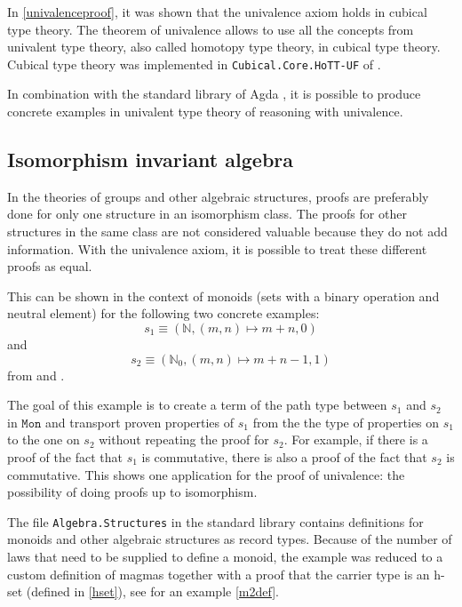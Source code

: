 \documentclass[12pt,a4paper,twoside,xetex]{book}
\newcommand{\op}[1]{\mathtt{#1}}
\begin{document}
In \cref{univalenceproof}, it was shown that the univalence axiom holds in 
cubical type theory. The theorem of univalence allows to use all the 
concepts from univalent type theory, also called homotopy type theory, in 
cubical type theory. Cubical type theory was implemented in 
\texttt{Cubical.Core.HoTT-UF} of \cite{Moertberg2018}.

In combination with the standard library of Agda \cite{Danielsson2019}, it is 
possible to produce concrete examples in univalent type theory of reasoning 
with univalence.

\subsection{Isomorphism invariant algebra}\label{magmas}

In the theories of groups and other algebraic structures, proofs are preferably 
done for only one structure in an isomorphism class. The proofs for other 
structures in the same class are not considered valuable because they do not 
add information. With the univalence axiom, it is possible to treat these 
different proofs as equal. 

This can be shown in the context of monoids (sets with a binary operation and 
neutral element) for the following two concrete examples: $$s_1  \equiv 
(\mathbb{N}, (m,n)\mapsto m+n, 0)$$ and $$s_2 \equiv (\mathbb{N}_0, 
(m,n)\mapsto m+n -1, 1)$$ from \cite{Coquand2013} and \cite{Danielsson2012}. 

The goal of this example is to create a term of the path type between  $s_1$ 
and $s_2$ in $\op{Mon}$ and transport proven properties of $s_1$ from the the 
type of properties on $s_1$ to the one on $s_2$ without repeating the proof for 
$s_2$. For example, if there is a proof of the fact that $s_1$ is commutative, 
there is also a proof of the fact that $s_2$ is commutative. This shows one 
application for the proof of univalence: the possibility of doing proofs up to 
isomorphism. 

The file \texttt{Algebra.Structures} in the standard library  
\cite{Danielsson2019} contains definitions for monoids and other algebraic 
structures as record types. Because of the number of  laws that need to be 
supplied to define a monoid, the example was reduced to a custom definition of 
magmas together with a proof that the carrier type is an h-set (defined in 
\cref{hset}), see for an example \cref{m2def}. 
\end{document}
